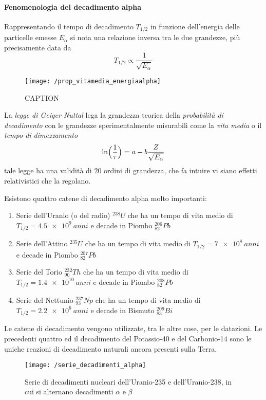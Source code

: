 \paragraph{Fenomenologia del decadimento alpha} Rappresentando il tempo di decadimento $T_{1/2}$ in funzione dell'energia delle particelle emesse $E_{\alpha}$ si nota una relazione inversa tra le due grandezze, più precisamente data da
\begin{equation}
T_{1/2} \propto \frac{1}{\sqrt{E_{\alpha}}}
\end{equation}
\begin{figure}[h]
\centering
\texttt{[image: /prop\_vitamedia\_energiaalpha]}
\caption{CAPTION}
\end{figure}
La \emph{legge di Geiger Nuttal} lega la grandezza teorica della \emph{probabilità di decadimento} con le grandezze sperimentalmente misurabili come la \emph{vita media} o il \emph{tempo di dimezzamento}
\begin{equation}
\ln \Bigl(  \frac{1}{\tau}  \Bigr) = a - b \frac{Z}{\sqrt{E_{\alpha}}}
\end{equation}
tale legge ha una validità di $20$ ordini di grandezza, che fa intuire vi siano effetti relativistici che la regolano.

Esistono quattro catene di decadimento alpha molto importanti:
\begin{enumerate}
\item Serie dell'Uranio (o del radio) $^{238}U$ che ha un tempo di vita medio di  $T_{1/2}=\SI{4.5e9}{anni}$ e decade in Piombo $^{206}_{82}Pb$

\item Serie dell'Attino $^{235}U$ che ha un tempo di vita medio di  $T_{1/2}=\SI{7e8}{anni}$ e decade in Piombo $^{207}_{82}Pb$

\item Serie del Torio $^{232}_{90}Th$ che ha un tempo di vita medio di  $T_{1/2}=\SI{1.4e10}{anni}$ e decade in Piombo $^{208}_{82}Pb$

\item Serie del Nettunio $^{237}_{93}Np$ che ha un tempo di vita medio di  $T_{1/2}=\SI{2.2e6}{anni}$ e decade in Bismuto $^{209}_{83}Bi$
\end{enumerate}
Le catene di decadimento vengono utilizzate, tra le altre cose, per le datazioni.
Le precedenti quattro ed il decadimento del Potassio-40 e del Carbonio-14 sono le uniche reazioni di decadimento naturali ancora presenti sulla Terra.
\begin{figure}[h]
\centering
\texttt{[image: /serie\_decadimenti\_alpha]}
\caption{Serie di decadimenti nucleari dell'Uranio-235 e dell'Uranio-238, in cui si alternano decadimenti $\alpha$ e $\beta$}
\end{figure}

